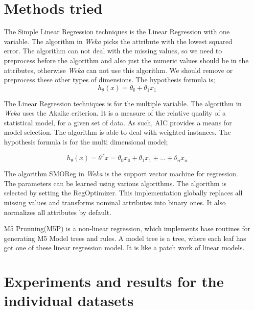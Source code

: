 \documentclass[a4paper]{article}
\begin{document}
\section{Methods tried}

The Simple Linear Regression techniques is the Linear Regression with one variable. The algorithm in \emph{Weka} picks the attribute with the lowest squared error. The algorithm can not deal with the missing values, so we need to preprocess before the algorithm and also just the numeric values should be in the attributes, otherwise \emph{Weka} can not use this algorithm. We should remove or preprocess these other types of dimensions. The hypothesis formula is;
\begin{equation*}
h_\theta (x) = \theta_0+ \theta_1 x_1
\end{equation*}

The Linear Regression techniques is for the multiple variable. The algorithm in \emph{Weka} uses the Akaike criterion. It is a measure of the relative quality of a statistical model, for a given set of data. As such, AIC provides a means for model selection. The algorithm is able to deal with weighted instances. The hypothesis formula is for the multi dimensional model;

\begin{equation*}
h_\theta (x) = \theta^T x =\theta_0 x_0+ \theta_1 x_1 + \dots + \theta_n x_n
\end{equation*}

     The algorithm SMOReg in \emph{Weka} is the support vector machine for regression. The parameters can be learned using various algorithms. The algorithm is selected by setting the RegOptimizer. This implementation globally replaces all missing values and transforms nominal attributes into binary ones. It also normalizes all attributes by default.

     M5 Prunning(M5P)  is a non-linear regression, which implements base routines for generating M5 Model trees and rules. A model tree is a tree, where each leaf has got one of these linear regression model. It is like a patch work of linear models.  

\section{Experiments and results for the individual datasets}
\end{document}
